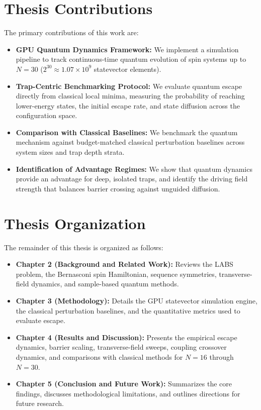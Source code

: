 \documentclass[12pt,a4paper]{report}
\begin{document}
\section{Thesis Contributions}
\label{sec:contributions}
The primary contributions of this work are:
\begin{itemize}
    \item \textbf{GPU Quantum Dynamics Framework:} We implement a simulation pipeline to track continuous-time quantum evolution of spin systems up to $N = 30$ ($2^{30} \approx 1.07 \times 10^9$ statevector elements).
    \item \textbf{Trap-Centric Benchmarking Protocol:} We evaluate quantum escape directly from classical local minima, measuring the probability of reaching lower-energy states, the initial escape rate, and state diffusion across the configuration space.
    \item \textbf{Comparison with Classical Baselines:} We benchmark the quantum mechanism against budget-matched classical perturbation baselines across system sizes and trap depth strata.
    \item \textbf{Identification of Advantage Regimes:} We show that quantum dynamics provide an advantage for deep, isolated traps, and identify the driving field strength that balances barrier crossing against unguided diffusion.
\end{itemize}

\section{Thesis Organization}
\label{sec:organization}
The remainder of this thesis is organized as follows:
\begin{itemize}
    \item \textbf{Chapter 2 (Background and Related Work):} Reviews the LABS problem, the Bernasconi spin Hamiltonian, sequence symmetries, transverse-field dynamics, and sample-based quantum methods.
    \item \textbf{Chapter 3 (Methodology):} Details the GPU statevector simulation engine, the classical perturbation baselines, and the quantitative metrics used to evaluate escape.
    \item \textbf{Chapter 4 (Results and Discussion):} Presents the empirical escape dynamics, barrier scaling, transverse-field sweeps, coupling crossover dynamics, and comparisons with classical methods for $N = 16$ through $N = 30$.
    \item \textbf{Chapter 5 (Conclusion and Future Work):} Summarizes the core findings, discusses methodological limitations, and outlines directions for future research.
\end{itemize}
\end{document}
